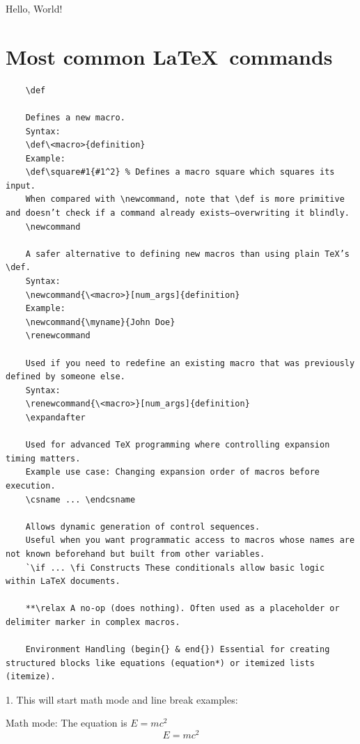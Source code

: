 \documentclass[12pt, a4paper]{article}
\begin{document}
Hello, World!
% 

\vspace{10cm} %


\section{Most common \LaTeX~commands}


\begin{verbatim}
    \def

    Defines a new macro.
    Syntax:
    \def\<macro>{definition}
    Example:
    \def\square#1{#1^2} % Defines a macro square which squares its input.
    When compared with \newcommand, note that \def is more primitive and doesn’t check if a command already exists—overwriting it blindly.
    \newcommand
    
    A safer alternative to defining new macros than using plain TeX’s \def.
    Syntax:
    \newcommand{\<macro>}[num_args]{definition}
    Example:
    \newcommand{\myname}{John Doe}
    \renewcommand
    
    Used if you need to redefine an existing macro that was previously defined by someone else.
    Syntax:
    \renewcommand{\<macro>}[num_args]{definition}
    \expandafter
    
    Used for advanced TeX programming where controlling expansion timing matters.
    Example use case: Changing expansion order of macros before execution.
    \csname ... \endcsname
    
    Allows dynamic generation of control sequences.
    Useful when you want programmatic access to macros whose names are not known beforehand but built from other variables.
    `\if ... \fi Constructs These conditionals allow basic logic within LaTeX documents.
    
    **\relax A no-op (does nothing). Often used as a placeholder or delimiter marker in complex macros.
    
    Environment Handling (begin{} & end{}) Essential for creating structured blocks like equations (equation*) or itemized lists (itemize).
\end{verbatim}
    

\hspace{-3cm} 1. This will start math mode and line break examples:

Math mode: \hfill \break
\hspace{5cm} The equation is \(E = mc^2\) %
\[
    E=mc^2 %
\]
\end{document}
